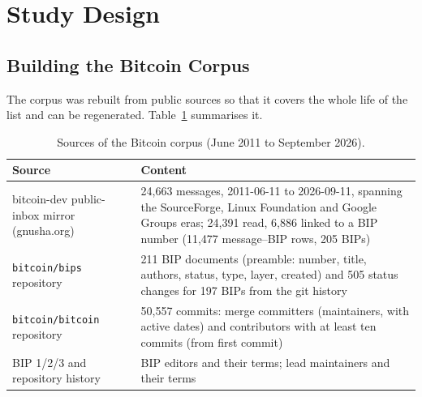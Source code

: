 \section{Study Design}
\label{sec:design}

\subsection{Building the Bitcoin Corpus}
\label{sec:corpus}

The corpus was rebuilt from public sources so that it covers the whole life of the list and can be regenerated. Table~\ref{tab:sources} summarises it.

\begin{table}[t]
\caption{Sources of the Bitcoin corpus (June 2011 to September 2026).}
\label{tab:sources}
\footnotesize
\setlength{\tabcolsep}{3.5pt}
\begin{tabular}{p{}p{}}
\toprule
Source & Content \\
\midrule
bitcoin-dev public-inbox mirror (gnusha.org) & 24,663 messages, 2011-06-11 to 2026-09-11, spanning the SourceForge, Linux Foundation and Google Groups eras; 24,391 read, 6,886 linked to a BIP number (11,477 message--BIP rows, 205 BIPs) \\
\texttt{bitcoin/bips} repository & 211 BIP documents (preamble: number, title, authors, status, type, layer, created) and 505 status changes for 197 BIPs from the git history \\
\texttt{bitcoin/bitcoin} repository & 50,557 commits: merge committers (maintainers, with active dates) and contributors with at least ten commits (from first commit) \\
BIP 1/2/3 and repository history & BIP editors and their terms; lead maintainers and their terms \\
\bottomrule
\end{tabular}
\end{table}


